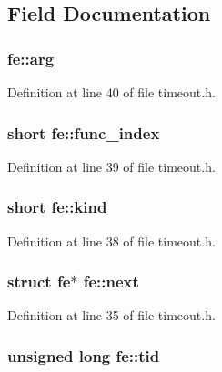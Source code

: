 \subsection{Field Documentation}
\hypertarget{structfe_af8afc64eb9762bdebb734e9a50f31be6}{
\subsubsection[{arg}]{ fe\+::arg}}\label{structfe_af8afc64eb9762bdebb734e9a50f31be6}


Definition at line 40 of file timeout.\+h.

\hypertarget{structfe_a109f07fc6199d864efa47312c125ded0}{
\subsubsection[{func\+\_\+index}]{\setlength{\rightskip}{0pt plus 5cm}short fe\+::func\+\_\+index}}\label{structfe_a109f07fc6199d864efa47312c125ded0}


Definition at line 39 of file timeout.\+h.

\hypertarget{structfe_ad8880bd27452108bd90e4844c5418d64}{
\subsubsection[{kind}]{\setlength{\rightskip}{0pt plus 5cm}short fe\+::kind}}\label{structfe_ad8880bd27452108bd90e4844c5418d64}


Definition at line 38 of file timeout.\+h.

\hypertarget{structfe_ab567224f30e1b4195efc577713a61f81}{
\subsubsection[{next}]{\setlength{\rightskip}{0pt plus 5cm}struct {\bf fe}$\ast$ fe\+::next}}\label{structfe_ab567224f30e1b4195efc577713a61f81}


Definition at line 35 of file timeout.\+h.

\hypertarget{structfe_a08f96e3cc689e2f46a23c4e568999a5b}{
\subsubsection[{tid}]{\setlength{\rightskip}{0pt plus 5cm}unsigned long fe\+::tid}}\label{structfe_a08f96e3cc689e2f46a23c4e568999a5b}


